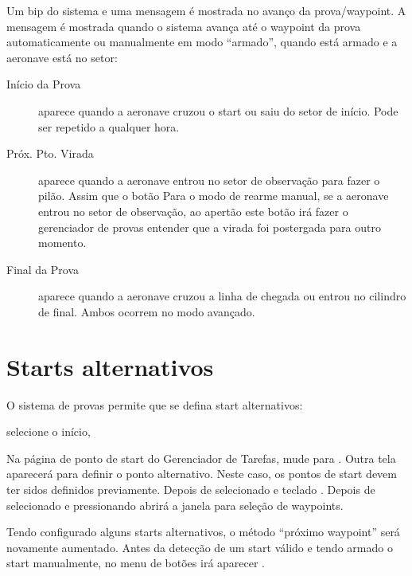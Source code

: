 Um bip do sistema e uma mensagem é mostrada no avanço da prova/waypoint.  A mensagem é mostrada quando o sistema avança até o waypoint da prova automaticamente ou manualmente em modo “armado”, quando está armado e a aeronave está no setor:
\begin{description}
\item[Início da Prova]  aparece quando a aeronave cruzou o start ou saiu do setor de início.  Pode ser repetido a qualquer hora.
\item[Próx. Pto. Virada]  aparece quando a aeronave entrou no setor de observação para fazer o pilão.  Assim que o botão 
  Para o modo de rearme manual, se a aeronave entrou no setor de observação, ao apertão este botão irá fazer o gerenciador de provas entender que a virada foi postergada para outro momento.
\item[Final da Prova]  aparece quando a aeronave cruzou a linha de chegada ou entrou no cilindro de final.  Ambos ocorrem no modo avançado. 
\end{description}


\section{Starts alternativos}\label{sec:alternate-starts}



O sistema de provas permite que se defina start alternativos:

\blink{} selecione o início, \blink{}

Na página de ponto de start do Gerenciador de Tarefas, mude para . Outra tela aparecerá para definir o ponto alternativo.  Neste caso, os pontos de start devem ter sidos definidos previamente.  Depois de selecionado  e teclado . Depois de selecionado e pressionando 
 abrirá a janela para seleção de waypoints.
 
Tendo configurado alguns starts alternativos, o método “próximo waypoint” será novamente aumentado.  Antes da detecção de um start válido e tendo armado o start manualmente, no menu de botões irá aparecer  .

